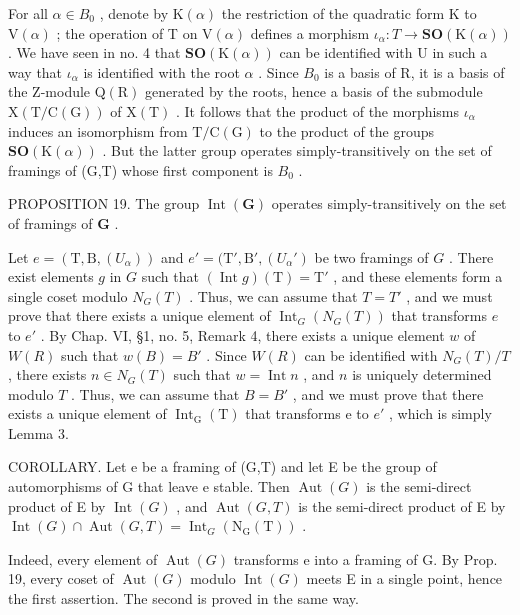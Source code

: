 For all \(\alpha\in B_{0}\) , denote by \(\mathrm{K}(\alpha)\) the restriction of the quadratic form K to \(\mathrm{V}(\alpha)\) ; the operation of T on \(\mathrm{V}(\alpha)\) defines a morphism \(\iota_{\alpha}:T\to\mathbf{SO}(\mathrm{K}(\alpha))\) . We have seen in no. 4 that \(\mathbf{SO}(\mathrm{K}(\alpha))\) can be identified with U in such a way that \(\iota_{\alpha}\) is identified with the root \(\alpha\) . Since \(B_{0}\) is a basis of R, it is a basis of the Z-module \(\mathrm{Q}(\mathrm{R})\) generated by the roots, hence a basis of the submodule \(\mathrm{X}(\mathrm{T}/\mathrm{C}(\mathrm{G}))\) of \(\mathrm{X}(\mathrm{T})\) . It follows that the product of the morphisms \(\iota_{\alpha}\) induces an isomorphism from \(\mathrm{T}/\mathrm{C}(\mathrm{G})\) to the product of the groups \(\mathbf{SO}(\mathrm{K}(\alpha))\) . But the latter group operates simply-transitively on the set of framings of (G,T) whose first component is \(B_{0}\) .

PROPOSITION 19. The group \(\operatorname{Int}(\mathbf{G})\) operates simply-transitively on the set of framings of \(\mathbf{G}\) .

Let \(e = (\mathrm{T}, \mathrm{B}, (U_{\alpha}))\) and \(e' = (\mathrm{T}', \mathrm{B}', (U_{\alpha}')\) be two framings of \(G\) . There exist elements \(g\) in \(G\) such that \((\operatorname{Int} g)(\mathrm{T}) = \mathrm{T}'\) , and these elements form a single coset modulo \(N_G(T)\) . Thus, we can assume that \(T = T'\) , and we must prove that there exists a unique element of \(\operatorname{Int}_G(N_G(T))\) that transforms \(e\) to \(e'\) . By Chap. VI, §1, no. 5, Remark 4, there exists a unique element \(w\) of \(W(R)\) such that \(w(B) = B'\) . Since \(W(R)\) can be identified with \(N_G(T)/T\) , there exists \(n \in N_G(T)\) such that \(w = \operatorname{Int} n\) , and \(n\) is uniquely determined modulo \(T\) . Thus, we can assume that \(B = B'\) , and we must prove that there exists a unique element of \(\operatorname{Int}_{\mathrm{G}}(\mathrm{T})\) that transforms e to \(e'\) , which is simply Lemma 3.

COROLLARY. Let e be a framing of (G,T) and let E be the group of automorphisms of G that leave e stable. Then \(\operatorname{Aut}(G)\) is the semi-direct product of E by \(\operatorname{Int}(G)\) , and \(\operatorname{Aut}(G,T)\) is the semi-direct product of E by \(\operatorname{Int}(G)\cap\operatorname{Aut}(G,T)=\operatorname{Int}_{G}(\mathrm{N}_{\mathrm{G}}(\mathrm{T}))\) .

Indeed, every element of \(\operatorname{Aut}(G)\) transforms e into a framing of G. By Prop. 19, every coset of \(\operatorname{Aut}(G)\) modulo \(\operatorname{Int}(G)\) meets E in a single point, hence the first assertion. The second is proved in the same way.

